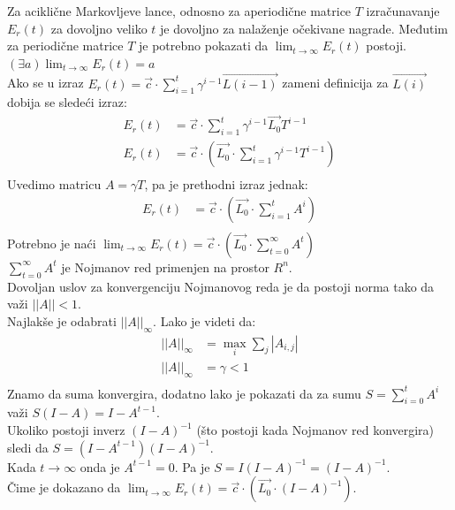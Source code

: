 \documentclass[a4paper,fleqn,12pt]{JMThesis}
\theoremstyle{plain}
\theoremstyle{definition}
\newcommand{\zbtg}{\sum_{t=0}^\infty}
\theoremstyle{definition}
\begin{document}
\medskip
Za aciklične Markovljeve lance, odnosno za aperiodične matrice $T$ izračunavanje $E_r(t)$ za dovoljno veliko $t$ je dovoljno za nalaženje očekivane nagrade.
Međutim za periodične matrice $T$ je potrebno pokazati da $\lim_{t \to \infty}{E_r(t)}$ postoji.
\lem $(\exists a) \lim_{t \to \infty}{E_r(t)} = a$\\
Ako se u izraz $E_r(t) = \vec{c} \cdot \sum_{i=1}^{t}\gamma^{i-1}\vec{L(i-1)}$ zameni definicija za $\vec{L(i)}$ dobija se sledeći izraz:
\[
	\begin{split}
	E_r(t) &= \vec{c} \cdot \sum_{i=1}^{t}\gamma^{i-1}\vec{L_0}T^{i-1}\\
	E_r(t) &= \vec{c} \cdot \left( \vec{L_0} \cdot \sum_{i=1}^{t}\gamma^{i-1}T^{i-1}\right)\\
	\end{split}
\]
Uvedimo matricu $A = \gamma T$, pa je prethodni izraz jednak: \\
\[
	\begin{split}
	E_r(t) &= \vec{c} \cdot \left( \vec{L_0} \cdot \sum_{i=1}^{t}A^i \right)\\
	\end{split}
\]
Potrebno je naći $\lim_{t \to \infty}{E_r(t)} = \vec{c} \cdot \left( \vec{L_0}\cdot \zbtg A^t \right)$\\
$\zbtg A^t$ je Nojmanov red primenjen na prostor $R^n$.\\
Dovoljan uslov za konvergenciju Nojmanovog reda je da postoji norma tako da važi $||A|| < 1$.\\
Najlakše je odabrati $||A||_{\infty}$. Lako je videti da:
\[
	\begin{split}
	||A||_{\infty} &= \max_{i}\sum_{j}|A_{i,j}|\\
	||A||_{\infty} &= \gamma < 1\\
	\end{split}
\]
Znamo da suma konvergira, dodatno lako je pokazati da za sumu $S = \sum_{i=0}^{t}A^i$ važi $S(I - A) = I - A^{t-1}$.\\
Ukoliko postoji inverz $(I - A)^{-1}$ (što postoji kada Nojmanov red konvergira) sledi da $S=(I - A^{t-1})(I-A)^{-1}$.\\
Kada $t \to \infty$ onda je $A^{t-1} = 0$. Pa je $S = I(I-A)^{-1} = (I-A)^{-1}$.\\
Čime je dokazano da $\lim_{t \to \infty}{E_r(t)} = \vec{c} \cdot \left( \vec{L_0} \cdot (I-A)^{-1} \right)$.
\medskip \\
\end{document}
